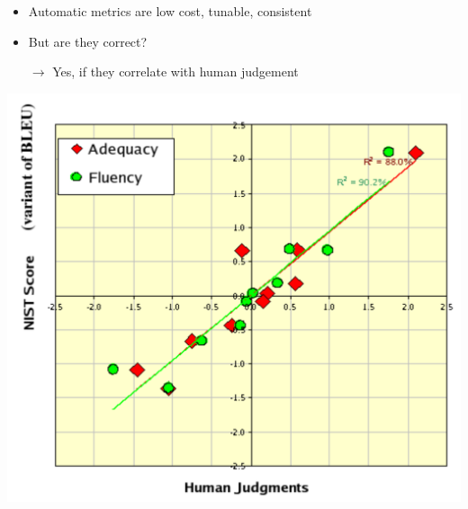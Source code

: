 \documentclass[landscape]{slides}
\begin{document}

\vspace{40mm}
\begin{itemize}
\item Automatic metrics are low cost, tunable, consistent
\item But are they correct?
\item[$\rightarrow$] Yes, if they correlate with human judgement
\end{itemize}



\begin{center}\vspace{-5mm}
\includegraphics[scale=0.85]{bleu-adequacy-fluency.pdf}
\end{center} 

\end{document}
